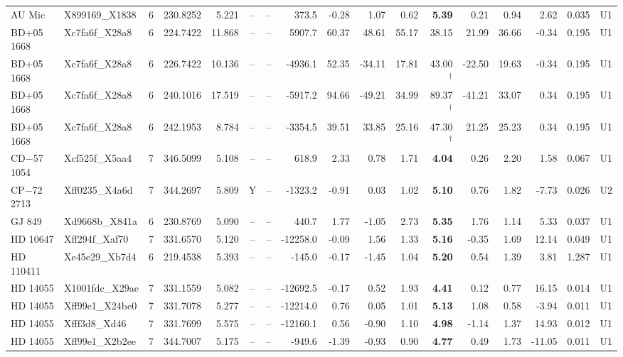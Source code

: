 \begin{tabular}{@{}l@{~}l@{~}c@{~}r@{~}r@{~}c@{~}l@{~}r@{~~}r@{~}r@{~}r@{~~}r@{~}r@{~}r@{~~}r@{~}r@{~}l@{}}
AU Mic & X899169\_X1838 & 6 & 230.8252 & 5.221 & -- & -- & 373.5 & -0.28 & 1.07 & 0.62 & \textbf{5.39} & 0.21 & 0.94 & 2.62 & 0.035 & U1 \\
BD+05 1668 & Xc7fa6f\_X28a8 & 6 & 224.7422 & 11.868 & -- & -- & 5907.7 & 60.37 & 48.61 & 55.17 & 38.15 & 21.99 & 36.66 & -0.34 & 0.195 & U1 \\
BD+05 1668 & Xc7fa6f\_X28a8 & 6 & 226.7422 & 10.136 & -- & -- & -4936.1 & 52.35 & -34.11 & 17.81 & 43.00$^{\dagger}$ & -22.50 & 19.63 & -0.34 & 0.195 & U1 \\
BD+05 1668 & Xc7fa6f\_X28a8 & 6 & 240.1016 & 17.519 & -- & -- & -5917.2 & 94.66 & -49.21 & 34.99 & 89.37$^{\dagger}$ & -41.21 & 33.07 & 0.34 & 0.195 & U1 \\
BD+05 1668 & Xc7fa6f\_X28a8 & 6 & 242.1953 & 8.784 & -- & -- & -3354.5 & 39.51 & 33.85 & 25.16 & 47.30$^{\dagger}$ & 21.25 & 25.23 & 0.34 & 0.195 & U1 \\
CD$-$57 1054 & Xcf525f\_X5aa4 & 7 & 346.5099 & 5.108 & -- & -- & 618.9 & 2.33 & 0.78 & 1.71 & \textbf{4.04} & 0.26 & 2.20 & 1.58 & 0.067 & U1 \\
CP$-$72 2713 & Xff0235\_X4a6d & 7 & 344.2697 & 5.809 & Y & -- & -1323.2 & -0.91 & 0.03 & 1.02 & \textbf{5.10} & 0.76 & 1.82 & -7.73 & 0.026 & U2 \\
GJ 849 & Xd9668b\_X841a & 6 & 230.8769 & 5.090 & -- & -- & 440.7 & 1.77 & -1.05 & 2.73 & \textbf{5.35} & 1.76 & 1.14 & 5.33 & 0.037 & U1 \\
HD 10647 & Xff294f\_Xaf70 & 7 & 331.6570 & 5.120 & -- & -- & -12258.0 & -0.09 & 1.56 & 1.33 & \textbf{5.16} & -0.35 & 1.69 & 12.14 & 0.049 & U1 \\
HD 110411 & Xe45e29\_Xb7d4 & 6 & 219.4538 & 5.393 & -- & -- & -145.0 & -0.17 & -1.45 & 1.04 & \textbf{5.20} & 0.54 & 1.39 & 3.81 & 1.287 & U1 \\
HD 14055 & X1001fdc\_X29ae & 7 & 331.1559 & 5.082 & -- & -- & -12692.5 & -0.17 & 0.52 & 1.93 & \textbf{4.41} & 0.12 & 0.77 & 16.15 & 0.014 & U1 \\
HD 14055 & Xff99e1\_X24be0 & 7 & 331.7078 & 5.277 & -- & -- & -12214.0 & 0.76 & 0.05 & 1.01 & \textbf{5.13} & 1.08 & 0.58 & -3.94 & 0.011 & U1 \\
HD 14055 & Xfff3d8\_Xd46 & 7 & 331.7699 & 5.575 & -- & -- & -12160.1 & 0.56 & -0.90 & 1.10 & \textbf{4.98} & -1.14 & 1.37 & 14.93 & 0.012 & U1 \\
HD 14055 & Xff99e1\_X2b2ee & 7 & 344.7007 & 5.175 & -- & -- & -949.6 & -1.39 & -0.93 & 0.90 & \textbf{4.77} & 0.49 & 1.73 & -11.05 & 0.011 & U1 \\

\end{tabular}
